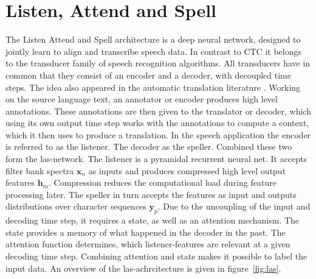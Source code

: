 \section{Listen, Attend and Spell \cite{Chan2015}}
The Listen Attend and Spell architecture is a deep neural network, designed to jointly learn to align and transcribe speech data. In contrast to CTC it belongs to the transducer family of speech recognition algorithms. All transducers have in common that they consist of an encoder and a decoder, with decoupled time steps. The idea also appeared in the automatic translation literature \cite{Bahdanau2015}. Working on the source language text, an annotator or encoder produces high level annotations. These annotations are then given to the translator or decoder, which using its own output time step works with the annotations to compute a context, which it then uses to produce a translation.
In the speech application the encoder is referred to as the listener. The decoder as the speller. Combined these two form the las-network. The listener is a pyramidal recurrent neural net. It accepts filter bank spectra $\mathbf{x}_n$ as inputs and produces compressed high level output features $\mathbf{h}_m$. Compression reduces the computational load during feature processing later.
The speller in turn accepts the features as input and outputs distributions over character sequences $\mathbf{y}_p$. Due to the uncoupling of the input and decoding time step, it requires a state, as well as an attention mechanism. The state provides a memory of what happened in the decoder in the past. The attention function determines, which listener-features are relevant at a given decoding time step. Combining attention and state makes it possible to label the input data. An overview of the las-achrcitecture is given in figure~\ref*{fig:las}.


